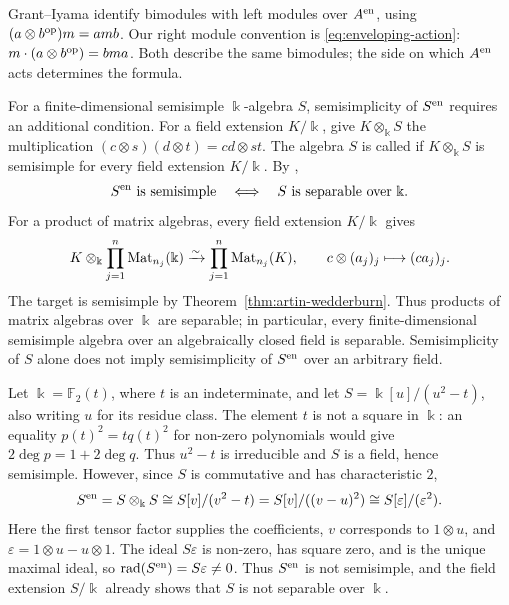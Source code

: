 \begin{advanced}
Grant--Iyama \cite[\S2, p.~2591]{GI20} identify bimodules with left modules over $A^{\mathrm{en}}$, using $(a\otimes b^{\mathrm{op}})m=amb$.
Our right module convention is \eqref{eq:enveloping-action}: $m\cdot(a\otimes b^{\mathrm{op}})=bma$.
Both describe the same bimodules; the side on which $A^{\mathrm{en}}$ acts determines the formula.

\begin{remark}\label{rem:enveloping-semisimple}
For a finite-dimensional semisimple $\Bbbk$-algebra $S$, semisimplicity of $S^{\mathrm{en}}$ requires an additional condition.
For a field extension $K/\Bbbk$, give $K\otimes_\Bbbk S$ the multiplication $(c\otimes s)(d\otimes t)=cd\otimes st$.
The algebra $S$ is called  if $K\otimes_\Bbbk S$ is semisimple for every field extension $K/\Bbbk$.
By \cite[Theorem~6.1.2, p.~105]{DK94},
\[
S^{\mathrm{en}}\text{ is semisimple}
\quad\Longleftrightarrow\quad
S\text{ is separable over }\Bbbk.
\]
For a product of matrix algebras, every field extension $K/\Bbbk$ gives
\[
K\otimes_\Bbbk\prod_{j=1}^n\operatorname{Mat}\nolimits_{n_j}(\Bbbk)
\xrightarrow{\sim}\prod_{j=1}^n\operatorname{Mat}\nolimits_{n_j}(K),
\qquad c\otimes(a_j)_j\longmapsto(ca_j)_j.
\]
The target is semisimple by Theorem~\ref{thm:artin-wedderburn}.
Thus products of matrix algebras over $\Bbbk$ are separable; in particular, every finite-dimensional semisimple algebra over an algebraically closed field is separable.
Semisimplicity of $S$ alone does not imply semisimplicity of $S^{\mathrm{en}}$ over an arbitrary field.
\end{remark}

\begin{example}\label{ex:inseparable-envelope}
Let $\Bbbk=\mathbb F_2(t)$, where $t$ is an indeterminate, and let $S=\Bbbk[u]/(u^2-t)$, also writing $u$ for its residue class.
The element $t$ is not a square in $\Bbbk$: an equality $p(t)^2=tq(t)^2$ for non-zero polynomials would give $2\deg p=1+2\deg q$.
Thus $u^2-t$ is irreducible and $S$ is a field, hence semisimple.
However, since $S$ is commutative and has characteristic $2$,
\[
S^{\mathrm{en}}=S\otimes_\Bbbk S
\cong S[v]/(v^2-t)
=S[v]/((v-u)^2)
\cong S[\varepsilon]/(\varepsilon^2).
\]
Here the first tensor factor supplies the coefficients, $v$ corresponds to $1\otimes u$, and $\varepsilon=1\otimes u-u\otimes1$.
The ideal $S\varepsilon$ is non-zero, has square zero, and is the unique maximal ideal, so $\operatorname{rad}\nolimits(S^{\mathrm{en}})=S\varepsilon\neq0$.
Thus $S^{\mathrm{en}}$ is not semisimple, and the field extension $S/\Bbbk$ already shows that $S$ is not separable over $\Bbbk$.
\end{example}
\end{advanced}


